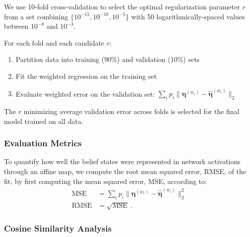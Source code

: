 \documentclass[prx,nofootinbib,onecolumn,showkeys,groupaddress,preprintnumbers,floatfix,
superscriptaddress]{revtex4-1}
\begin{document}
We use 10-fold cross-validation to select the optimal regularization parameter $r$ from a set combining $\{10^{-15}, 10^{-10}, 10^{-5}\}$ with 50 logarithmically-spaced values between $10^{-8}$ and $10^{-3}$.

For each fold and each candidate $r$:
\begin{enumerate}
\item Partition data into training (90\%) and validation (10\%) sets
\item Fit the weighted regression on the training set
\item Evaluate weighted error on the validation set: $\sum_i p_i \|\boldsymbol{\eta}^{(w_i)} - \hat{\boldsymbol{\eta}}^{(w_i)}\|_2$
\end{enumerate}

The $r$ minimizing average validation error across folds is selected for the final model trained on all data.

\subsubsection{Evaluation Metrics}

To quantify how well the belief states were represented in network activations through an affine map, we compute the root mean squared error, RMSE, of the fit, by first computing the mean squared error, MSE, according to:
\begin{align}
\text{MSE} &= \sum_i p_i \bigl\| \boldsymbol{\eta}^{(w_i)} - \hat{\boldsymbol{\eta}}^{(w_i)} \bigr\|_2^2 \\
\text{RMSE} &= \sqrt{\text{MSE}} ~.
\end{align}


\subsubsection{Cosine Similarity Analysis}
\end{document}
